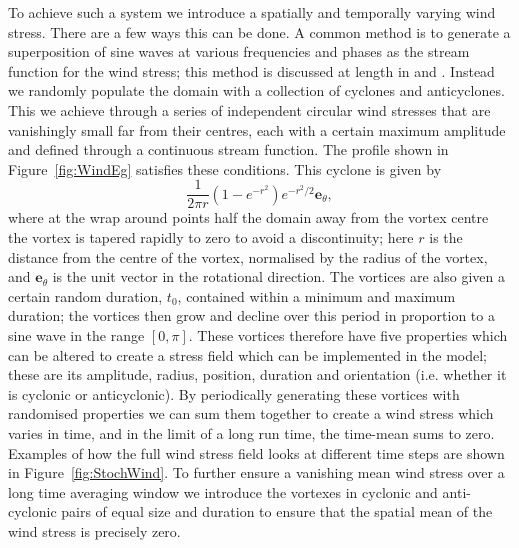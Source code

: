\documentclass[12pt,a4paper]{report}
\begin{document}
To achieve such a system we introduce a spatially and temporally 
varying wind stress. There are a few  ways this can be done. A common method
is to generate a superposition of sine waves at various frequencies and 
phases as the stream function for the wind stress; this method is discussed at
length in \cite{koszalka2009dynamics} and \cite{brannigan2015seasonal}. 
Instead we randomly populate the domain
with a collection of cyclones and anticyclones. This we achieve through a series of
independent circular wind stresses that are vanishingly small far from their centres,
each with a certain maximum amplitude and defined through a continuous stream function.
The profile shown in 
Figure~\ref{fig:WindEg} satisfies these conditions. This cyclone is given by 
\begin{equation*}
\frac{1}{2\pi r}(1-e^{-r^{2}})e^{-r^{2}/2}\boldsymbol{e}_{\theta},
\end{equation*}
where at the wrap around points half the domain away from the vortex centre the vortex 
is tapered rapidly to zero to avoid a discontinuity; here $r$ is the distance from the centre of the vortex, normalised by the
radius of the vortex, and $\boldsymbol{e}_{\theta}$ is the unit vector in the 
rotational direction. 
  The vortices are also given a certain random duration, $t_{0}$, contained within a minimum and maximum duration; the vortices then
grow and decline over this period in proportion to a sine wave in the range $[0,\pi]$.
These vortices therefore have five properties which can be altered to 
create a stress field which can be implemented in the model; these are its
amplitude, radius, position, duration and orientation (i.e. whether it is cyclonic
or anticyclonic). By periodically generating these vortices with randomised properties
we can sum them together to create a wind stress which varies in time, and in the limit
of a long run time, the time-mean sums to zero.
Examples of how the full wind stress field looks at different
time steps are shown in Figure~\ref{fig:StochWind}. To further ensure a vanishing
mean wind stress over a long time averaging window we introduce the vortexes in cyclonic
and anti-cyclonic pairs of equal size and duration to ensure that the spatial mean
of the wind stress is precisely zero. 
\end{document}
